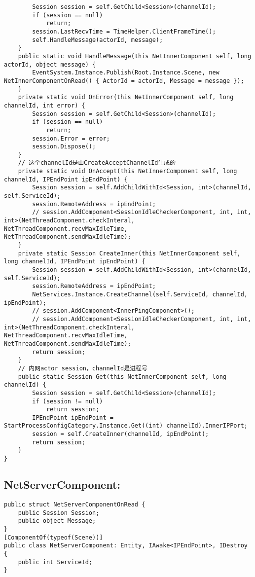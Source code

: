 \documentclass[9pt, b5paper]{article}
\begin{document}
\begin{verbatim}
        Session session = self.GetChild<Session>(channelId);
        if (session == null) 
            return;
        session.LastRecvTime = TimeHelper.ClientFrameTime();
        self.HandleMessage(actorId, message);
    }
    public static void HandleMessage(this NetInnerComponent self, long actorId, object message) {
        EventSystem.Instance.Publish(Root.Instance.Scene, new NetInnerComponentOnRead() { ActorId = actorId, Message = message });
    }
    private static void OnError(this NetInnerComponent self, long channelId, int error) {
        Session session = self.GetChild<Session>(channelId);
        if (session == null) 
            return;
        session.Error = error;
        session.Dispose();
    }
    // 这个channelId是由CreateAcceptChannelId生成的
    private static void OnAccept(this NetInnerComponent self, long channelId, IPEndPoint ipEndPoint) {
        Session session = self.AddChildWithId<Session, int>(channelId, self.ServiceId);
        session.RemoteAddress = ipEndPoint;
        // session.AddComponent<SessionIdleCheckerComponent, int, int, int>(NetThreadComponent.checkInteral, NetThreadComponent.recvMaxIdleTime, NetThreadComponent.sendMaxIdleTime);
    }
    private static Session CreateInner(this NetInnerComponent self, long channelId, IPEndPoint ipEndPoint) {
        Session session = self.AddChildWithId<Session, int>(channelId, self.ServiceId);
        session.RemoteAddress = ipEndPoint;
        NetServices.Instance.CreateChannel(self.ServiceId, channelId, ipEndPoint);
        // session.AddComponent<InnerPingComponent>();
        // session.AddComponent<SessionIdleCheckerComponent, int, int, int>(NetThreadComponent.checkInteral, NetThreadComponent.recvMaxIdleTime, NetThreadComponent.sendMaxIdleTime);
        return session;
    }
    // 内网actor session，channelId是进程号
    public static Session Get(this NetInnerComponent self, long channelId) {
        Session session = self.GetChild<Session>(channelId);
        if (session != null) 
            return session;
        IPEndPoint ipEndPoint = StartProcessConfigCategory.Instance.Get((int) channelId).InnerIPPort;
        session = self.CreateInner(channelId, ipEndPoint);
        return session;
    }
}
\end{verbatim}
\subsection{NetServerComponent:}
\label{sec-1-3}
\begin{verbatim}
public struct NetServerComponentOnRead {
    public Session Session;
    public object Message;
}
[ComponentOf(typeof(Scene))]
public class NetServerComponent: Entity, IAwake<IPEndPoint>, IDestroy {
    public int ServiceId;
}
\end{verbatim}
\end{document}
